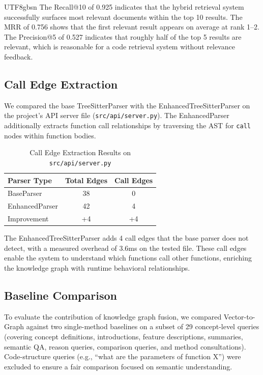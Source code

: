 \documentclass[11pt]{article}
\begin{document}
\begin{CJK*}{UTF8}{gbsn}
The Recall@10 of 0.925 indicates that the hybrid retrieval system successfully surfaces most relevant documents within the top 10 results. The MRR of 0.756 shows that the first relevant result appears on average at rank 1--2. The Precision@5 of 0.527 indicates that roughly half of the top 5 results are relevant, which is reasonable for a code retrieval system without relevance feedback.

\subsection{Call Edge Extraction}
We compared the base TreeSitterParser with the EnhancedTreeSitterParser on the project's API server file (\texttt{src/api/server.py}). The EnhancedParser additionally extracts function call relationships by traversing the AST for \texttt{call} nodes within function bodies.

\begin{table}[htbp]
\centering
\caption{Call Edge Extraction Results on \texttt{src/api/server.py}}
\label{tab:call_edges}
\begin{tabular}{lcc}
\toprule
Parser Type & Total Edges & Call Edges \\
\midrule
BaseParser & 38 & 0 \\
EnhancedParser & 42 & 4 \\
Improvement & +4 & +4 \\
\bottomrule
\end{tabular}
\end{table}

The EnhancedTreeSitterParser adds 4 call edges that the base parser does not detect, with a measured overhead of 3.6ms on the tested file. These call edges enable the system to understand which functions call other functions, enriching the knowledge graph with runtime behavioral relationships.

\subsection{Baseline Comparison}
To evaluate the contribution of knowledge graph fusion, we compared Vector-to-Graph against two single-method baselines on a subset of 29 concept-level queries (covering concept definitions, introductions, feature descriptions, summaries, semantic QA, reason queries, comparison queries, and method consultations). Code-structure queries (e.g., ``what are the parameters of function X'') were excluded to ensure a fair comparison focused on semantic understanding.


\end{CJK*}
\end{document}
